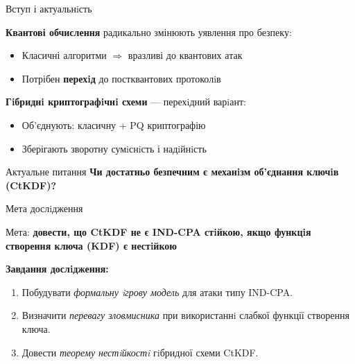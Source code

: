 \documentclass{beamer}
\title[Analysis of Efficiency and Security of Existing \\ BFT Paxos-Based Algorithms]
\date{}
\author[FFFF\quad|\quad Фесенко А. В.]{
    Illia Melnyk, Oleksandr Kurbatov, Oleg Fomenko, Volodymyr Dubinin and Yaroslav Panasenko
}
\institute{
    Науковий керівник: Фесенко Андрій Вʼячеславович
}
\begin{document}
\begin{frame}
  \titlepage
\end{frame}

\begin{frame}{Вступ і актуальнiсть}

\vspace{0.5em}
\textbf{Квантові обчислення} радикально змінюють уявлення про безпеку:
\begin{itemize}
  \item Класичні алгоритми $\Rightarrow$ вразливі до квантових атак 
  \item Потрібен \textbf{перехiд} до постквантових протоколiв
\end{itemize}

\vspace{0.5em}
\textbf{Гiбриднi криптографiчнi схеми} — перехiдний варiант:
\begin{itemize}
  \item Об’єднують: класичну + PQ криптографію
  \item Зберігають зворотну сумiснiсть і надiйнiсть
\end{itemize}


\vspace{0.5em}
\begin{block}{Актуальне питання}
  \centering
  \textbf{Чи достатньо безпечним є механiзм об’єднання ключiв (CtKDF)?}
\end{block}

\end{frame}


\begin{frame}{Мета дослiдження}

\begin{block}{Мета: }
\textbf{довести, що \textbf{CtKDF} \textbf{не є IND-CPA стiйкою}, якщо функцiя створення ключа (KDF) є нестiйкою}
\end{block}


\vspace{1em}
\textbf{Завдання дослiдження:}
\begin{enumerate}
  \item Побудувати \textit{формальну iгрову модель} для атаки типу IND-CPA.
  \item Визначити \textit{перевагу зловмисника} при використаннi слабкої функції створення ключа.
  \item Довести \textit{теорему нестiйкостi} гiбридної схеми CtKDF.
\end{enumerate}

\end{frame}
\end{document}
